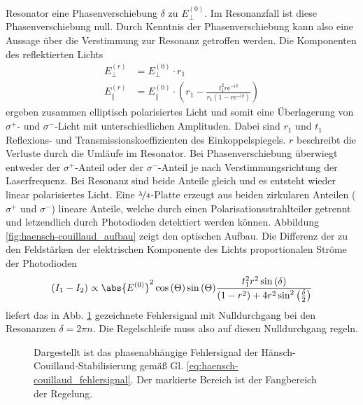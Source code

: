 Resonator eine Phasenverschiebung $\delta$ zu $E_{\perp}^{(0)}$. Im Resonanzfall
ist diese Phasenverschiebung null. Durch Kenntnis der Phasenverschiebung kann
also eine Aussage über die Verstimmung zur Resonanz getroffen werden. Die
Komponenten des reflektierten Lichts
\begin{equation}\label{eq:haensch-couillaud_02}
	\begin{split}
		E_{\perp}^{(r)} & = E_{\perp}^{(0)}\cdot r_1\\
		E_{\parallel}^{(r)} & = E_{\parallel}^{(0)}\cdot\left(r_1-\frac{t_1^2r\mathrm{e}^{-\mathrm{i}\delta}}{r_1\left(1-r\mathrm{e}^{-\mathrm{i}\delta}\right)}\right)
	\end{split}
\end{equation}
ergeben zusammen elliptisch polarisiertes Licht und somit eine Überlagerung von
$\sigma^+$- und $\sigma^-$-Licht mit unterschiedlichen Amplituden. Dabei sind
$r_1$ und $t_1$ Reflexions- und Transmissionskoeffizienten des
Einkoppelspiegels. $r$ beschreibt die Verluste durch die Umläufe im Resonator.
Bei Phasenverschiebung überwiegt entweder der $\sigma^+$-Anteil oder der
$\sigma^-$-Anteil je nach Verstimmungsrichtung der Laserfrequenz.
Bei Resonanz sind beide Anteile gleich und es entsteht wieder linear polarisiertes Licht. Eine $\nicefrac{\lambda}{4}$-Platte erzeugt aus beiden zirkularen Anteilen ($\sigma^+$ und $\sigma^-$) lineare Anteile, welche durch einen Polarisationsstrahlteiler getrennt und letzendlich durch Photodioden
detektiert werden können. Abbildung \ref{fig:haensch-couillaud_aufbau} zeigt den
optischen Aufbau. Die Differenz der zu den Feldstärken der elektrischen Komponente
des Lichts proportionalen Ströme der Photodioden
\begin{equation}\label{eq:haensch-couillaud_fehlersignal}
	(I_1-I_2)\propto\abs{E^{(0)}}^2\cos{(\Theta)}\sin{(\Theta)}\frac{t_1^2r^2\sin{(\delta)}}{(1-r^2)+4r^2\sin^2{\left(\frac{\delta}{2}\right)}}
\end{equation}
liefert das in Abb. \ref{fig:haensch-couillaud_fehlersignal} gezeichnete
Fehlersignal mit Nulldurchgang bei den Resonanzen $\delta=2\pi n$. Die
Regelschleife muss also auf diesen Nulldurchgang regeln.
\begin{figure}[h]
	\centering
	\footnotesize
	
	\caption[Hänsch-Couillaud - Fehlersignal]{Dargestellt ist das
	phasenabhängige Fehlersignal der Hänsch-Couillaud-Stabilisierung
	gemäß Gl.
	\eqref{eq:haensch-couillaud_fehlersignal}.
	Der markierte Bereich ist der
	Fangbereich der Regelung.}\label{fig:haensch-couillaud_fehlersignal}
\end{figure}


